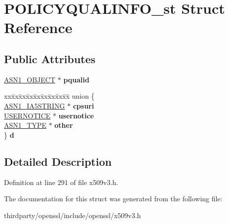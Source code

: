 \hypertarget{struct_p_o_l_i_c_y_q_u_a_l_i_n_f_o__st}{}\section{P\+O\+L\+I\+C\+Y\+Q\+U\+A\+L\+I\+N\+F\+O\+\_\+st Struct Reference}
\label{struct_p_o_l_i_c_y_q_u_a_l_i_n_f_o__st}
\subsection*{Public Attributes}
\begin{DoxyCompactItemize}
\item 
\mbox{\label{struct_p_o_l_i_c_y_q_u_a_l_i_n_f_o__st_a88696c938a44a9aa5d6eeb4b326beb10}} 
\hyperlink{structasn1__object__st}{A\+S\+N1\+\_\+\+O\+B\+J\+E\+CT} $\ast$ {\bfseries pqualid}
\item 
\mbox{\label{struct_p_o_l_i_c_y_q_u_a_l_i_n_f_o__st_ab2e9762972af97ab650ef063d6bc40a6}} 
\begin{tabbing}
xx\=xx\=xx\=xx\=xx\=xx\=xx\=xx\=xx\=\kill
union \{\\
\>\hyperlink{structasn1__string__st}{ASN1\_IA5STRING} $\ast$ {\bfseries cpsuri}\\
\>\hyperlink{struct_u_s_e_r_n_o_t_i_c_e__st}{USERNOTICE} $\ast$ {\bfseries usernotice}\\
\>\hyperlink{structasn1__type__st}{ASN1\_TYPE} $\ast$ {\bfseries other}\\
\} {\bfseries d}\\

\end{tabbing}\end{DoxyCompactItemize}


\subsection{Detailed Description}


Definition at line 291 of file x509v3.\+h.



The documentation for this struct was generated from the following file\+:\begin{DoxyCompactItemize}
\item 
thirdparty/openssl/include/openssl/x509v3.\+h\end{DoxyCompactItemize}
